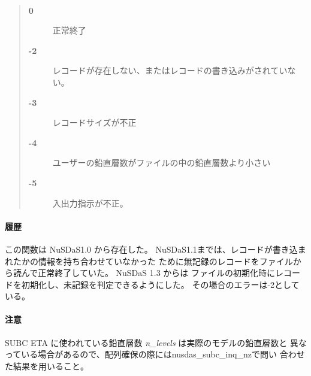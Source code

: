 \paragraph{\ResultCode}
\begin{quote}
\begin{description}
\item[{\bf 0}] 正常終了
\item[{\bf -2}] レコードが存在しない、またはレコードの書き込みがされていない。
\item[{\bf -3}] レコードサイズが不正
\item[{\bf -4}] ユーザーの鉛直層数がファイルの中の鉛直層数より小さい
\item[{\bf -5}] 入出力指示が不正。
\end{description}\end{quote}
\paragraph{ 履歴 }
この関数は NuSDaS1.0 から存在した。
NuSDaS1.1までは、レコードが書き込まれたかの情報を持ち合わせていなかった
ために無記録のレコードをファイルから読んで正常終了していた。 NuSDaS 1.3 からは
ファイルの初期化時にレコードを初期化し、未記録を判定できるようにした。
その場合のエラーは-2としている。
\paragraph{ 注意 }
SUBC ETA に使われている鉛直層数 {\it n\_levels} は実際のモデルの鉛直層数と
異なっている場合があるので、配列確保の際にはnusdas\_subc\_inq\_nzで問い
合わせた結果を用いること。

